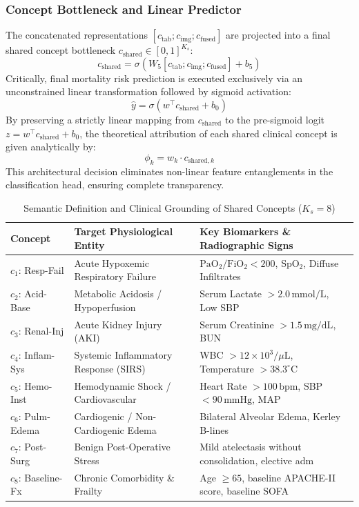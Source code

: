 \documentclass[10pt,journal,compsoc,twocolumn]{IEEEtran}
\begin{document}
\subsubsection{Concept Bottleneck and Linear Predictor}
The concatenated representations $[c_{\text{tab}}; c_{\text{img}}; c_{\text{fused}}]$ are projected into a final shared concept bottleneck $c_{\text{shared}} \in [0, 1]^{K_s}$:
\begin{equation}
    c_{\text{shared}} = \sigma\left(W_5 \left[c_{\text{tab}}; c_{\text{img}}; c_{\text{fused}}\right] + b_5\right)
\end{equation}
Critically, final mortality risk prediction is executed exclusively via an unconstrained linear transformation followed by sigmoid activation:
\begin{equation}
    \hat{y} = \sigma\left(w^\top c_{\text{shared}} + b_0\right)
\end{equation}
By preserving a strictly linear mapping from $c_{\text{shared}}$ to the pre-sigmoid logit $z = w^\top c_{\text{shared}} + b_0$, the theoretical attribution of each shared clinical concept is given analytically by:
\begin{equation}
    \phi_k = w_k \cdot c_{\text{shared}, k}
\end{equation}
This architectural decision eliminates non-linear feature entanglements in the classification head, ensuring complete transparency.

\begin{table}[h]
\centering
\caption{Semantic Definition and Clinical Grounding of Shared Concepts ($K_s=8$)}
\label{tab:concept_semantics}
\begin{tabular}{lll}
\toprule
\textbf{Concept} & \textbf{Target Physiological Entity} & \textbf{Key Biomarkers \& Radiographic Signs} \\
\midrule
$c_1$: Resp-Fail & Acute Hypoxemic Respiratory Failure & $\text{PaO}_2/\text{FiO}_2 < 200$, SpO$_2$, Diffuse Infiltrates \\
$c_2$: Acid-Base & Metabolic Acidosis / Hypoperfusion & Serum Lactate $> 2.0\,\text{mmol/L}$, Low SBP \\
$c_3$: Renal-Inj & Acute Kidney Injury (AKI) & Serum Creatinine $> 1.5\,\text{mg/dL}$, BUN \\
$c_4$: Inflam-Sys & Systemic Inflammatory Response (SIRS) & WBC $> 12 \times 10^3/\mu\text{L}$, Temperature $> 38.3^\circ\text{C}$ \\
$c_5$: Hemo-Inst & Hemodynamic Shock / Cardiovascular & Heart Rate $> 100\,\text{bpm}$, SBP $< 90\,\text{mmHg}$, MAP \\
$c_6$: Pulm-Edema & Cardiogenic / Non-Cardiogenic Edema & Bilateral Alveolar Edema, Kerley B-lines \\
$c_7$: Post-Surg & Benign Post-Operative Stress & Mild atelectasis without consolidation, elective adm \\
$c_8$: Baseline-Fx & Chronic Comorbidity \& Frailty & Age $\ge 65$, baseline APACHE-II score, baseline SOFA \\
\bottomrule
\end{tabular}
\end{table}
\end{document}
